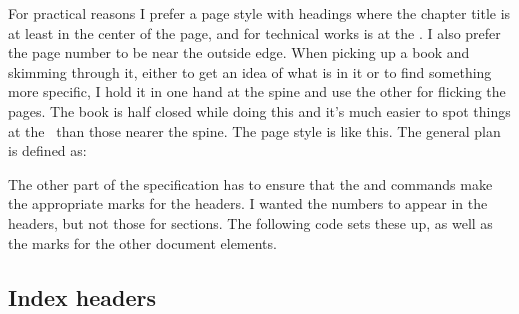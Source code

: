 \begin{plainlist}
    For practical reasons I prefer a page style with headings
where the chapter title is at least in the center 
of the page, and for technical works is at the \foredge. I also prefer the
page number to be near the outside edge. When picking up a book and skimming
through it, either to get an idea of what is in it or to find something more
specific, I hold it in one hand at the spine and use the other for flicking
the pages. The book is half closed while doing this and it's much easier
to spot things at the \foredge\ than those nearer the spine. 
The  page style is like this. The general plan is defined as:
\begin{lcode}
\end{lcode}
The other part of the specification has to ensure that the \cmd{\chapter}
and \cmd{\section} commands make the appropriate marks for the headers.
I wanted the numbers to appear in the headers, but not those for sections. The following
code sets these up, as well as the marks for the other document elements.
\begin{lcode}
\end{lcode}




\subsection{Index headers}



\end{plainlist}
